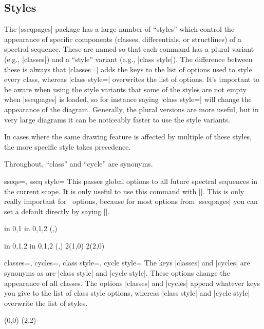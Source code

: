\documentclass{ltxdoc}
\begin{document}
\begin{sseqdata}[name=ex1,degree={#1}{1-#1}]
\subsection{Styles}
The |sseqpages| package has a large number of ``styles'' which control the appearance of specific components (classes, differentials, or structlines) of a spectral sequence. These are named so that each command has a plural variant (e.g., |classes|) and a ``style'' variant (e.g., |class style|). The difference between these is always that |classes=| adds the keys to the list of options used to style every class, whereas |class style=| overwrites the list of options. It's important to be aware when using the style variants that some of the styles are not empty when |sseqpages| is loaded, so for instance saying |class style={}| will change the appearance of the diagram. Generally, the plural versions are more useful, but in very large diagrams it can be noticeably faster to use the style variants.

In cases where the same drawing feature is affected by multiple of these styles, the more specific style takes precedence.

Throughout, ``class'' and ``cycle'' are synonyms. 
\begin{keylist}{sseqs=, sseq style=}
This passes global options to all future spectral sequences in the current scope. It is only useful to use this command with |\sseqset|. This is only really important for \tikzname\ options, because for most options from |sseqpages| you can set a default directly by saying ||.
\begin{codeexample}[]
\begin{sseqpage}
\foreach \x in {0,1} \foreach \y in {0,1,2}{
    \class(\x,\y)
}
\end{sseqpage}
\hskip1cm
\begin{sseqpage}[Adams grading,classes={fill,blue}]
\foreach \x in {0,1,2} \foreach \y in {0,1,2}{
    \class(\x,\y)
}
\d2(1,0)
\d2(2,0)
\end{sseqpage}
\end{codeexample}
\end{keylist}

\begin{keylist}{classes=, cycles=, class style=, cycle style=}
The keys |classes| and |cycles| are synonyms as are |class style| and |cycle style|. These options change the appearance of all classes. The options |classes| and |cycles| append whatever keys you give to the list of class style options, whereas |class style| and |cycle style| overwrite the list of styles.
\begin{codeexample}[]
\begin{sseqpage}[classes={blue,fill,minimum width=0.5em}]
\class(0,0)
\class(2,2)
\end{sseqpage}
\end{codeexample}
\end{keylist}



\end{sseqdata}
\end{document}

